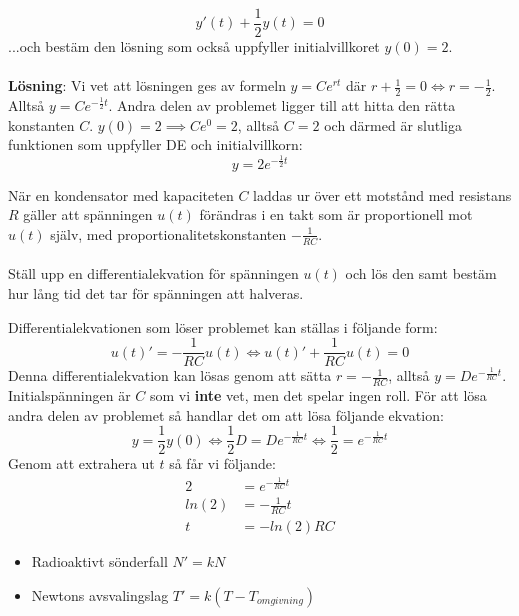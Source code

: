 \documentclass{report}
\begin{document}
{
\begin{equation*}
y'(t) + \frac{1}{2} y(t) = 0
\end{equation*}
...och bestäm den lösning som också uppfyller initialvillkoret $ y(0) = 2 $.\\\\

\textbf{Lösning}:
Vi vet att lösningen ges av formeln $ y = Ce^{rt} $ där $ r+ \frac{1}{2} = 0  \iff r = - \frac{1}{2}$. Alltså $ y= Ce^{ - \frac{1}{2} t} $. Andra delen av problemet ligger till att hitta den rätta konstanten $ C $. $ y(0) = 2 \implies Ce^0 = 2  $, alltså $ C = 2 $ och därmed är slutliga funktionen som uppfyller DE och initialvillkorn:
\begin{equation*}
	y= 2e^{- \frac{1}{2}t }
\end{equation*}
}

\pagebreak
\qs{}
{
När en kondensator med kapaciteten $ C $ laddas ur över ett motstånd med resistans $ R $ gäller att spänningen $ u(t) $ förändras i en takt som är proportionell mot $ u(t) $ själv, med proportionalitetskonstanten $ - \frac{1}{RC}  $.\\\\

Ställ upp en differentialekvation för spänningen $ u(t) $ och lös den samt bestäm hur lång tid det tar för spänningen att halveras.
}

\sol Differentialekvationen som löser problemet kan ställas i följande form:
\begin{equation*}
u(t)' = - \frac{1}{RC} u(t) \iff u(t)'+ \frac{1}{RC} u(t) = 0
\end{equation*}
Denna differentialekvation kan lösas genom att sätta $ r = - \frac{1}{RC}  $, alltså $ y = De^{ -\frac{1}{RC} t} $. Initialspänningen är $ C $ som vi \textbf{inte} vet, men det spelar ingen roll. För att lösa andra delen av problemet så handlar det om att lösa följande ekvation:
\begin{equation*}
	y = \frac{1}{2} y(0) \iff \frac{1}{2} D = De^{- \frac{1}{RC} t } \iff \frac{1}{2}  = e^{ - \frac{1}{RC} t}  
\end{equation*}
Genom att extrahera ut $ t $ så får vi följande:
\begin{align*}
	2 &= e^{ - \frac{1}{RC} t}\\
	ln(2) &= - \frac{1}{RC} t\\
	t &= -ln(2)RC
\end{align*}

\vspace{20pt}
{
\begin{itemize}
	\item Radioaktivt sönderfall $ N' = kN $
	\item Newtons avsvalingslag $ T' = k(T - T_{omgivning}) $ 
\end{itemize} 
}
\end{document}
